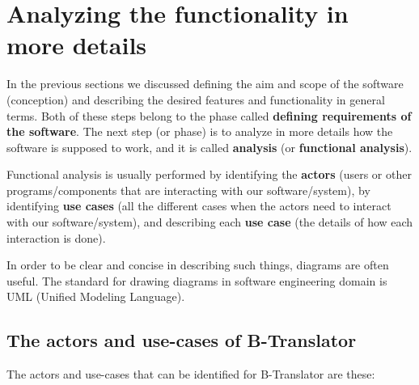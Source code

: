 \documentclass[11pt]{article}
\begin{document}
    

\section{Analyzing the functionality in more details}
\label{sec-4}


  In the previous sections we discussed defining the aim and scope of
  the software (conception) and describing the desired features and
  functionality in general terms. Both of these steps belong to the
  phase called \textbf{defining requirements of the software}. The next step
  (or phase) is to analyze in more details how the software is
  supposed to work, and it is called \textbf{analysis} (or \textbf{functional   analysis}).

  Functional analysis is usually performed by identifying the \textbf{actors}
  (users or other programs/components that are interacting with our
  software/system), by identifying \textbf{use cases} (all the different
  cases when the actors need to interact with our software/system),
  and describing each \textbf{use case} (the details of how each interaction
  is done).

  In order to be clear and concise in describing such things, diagrams
  are often useful. The standard for drawing diagrams in software
  engineering domain is UML (Unified Modeling Language).

\subsection{The actors and use-cases of B-Translator}
\label{sec-4.1}


   The actors and use-cases that can be identified for B-Translator
   are these:
   
\end{document}
